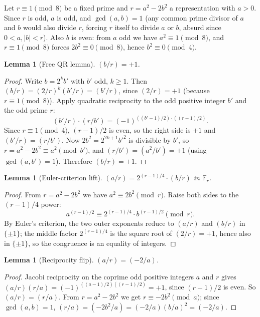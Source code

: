 \documentclass[12pt]{article}
\theoremstyle{plain}
\newtheorem{lemma}[theorem]{Lemma}
\theoremstyle{definition}
\theoremstyle{remark}
\begin{document}
Let \(r \equiv 1 \pmod 8\) be a fixed prime and \(r = a^2 - 2b^2\)
a representation with \(a > 0\). Since \(r\) is odd, \(a\) is odd,
and \(\gcd(a,b) = 1\) (any common prime divisor of \(a\) and \(b\)
would also divide \(r\), forcing \(r\) itself to divide \(a\) or
\(b\), absurd since \(0 < a, |b| < r\)). Also \(b\) is even: from
\(a\) odd we have \(a^2 \equiv 1 \pmod 8\), and \(r \equiv 1 \pmod 8\)
forces \(2b^2 \equiv 0 \pmod 8\), hence \(b^2 \equiv 0 \pmod 4\).

\begin{lemma}[Free QR lemma]\label{lem:A.1}
\((b/r) = +1\).
\end{lemma}


\begin{proof}
Write \(b = 2^k b'\) with \(b'\) odd, \(k \geq 1\). Then
\((b/r) = (2/r)^k (b'/r) = (b'/r)\), since \((2/r) = +1\) (because
\(r \equiv 1 \pmod 8\)). Apply quadratic reciprocity to the odd
positive integer \(b'\) and the odd prime \(r\):
\[
(b'/r) \cdot (r/b') = (-1)^{((b'-1)/2)\cdot((r-1)/2)}.
\]
Since \(r \equiv 1 \pmod 4\), \((r-1)/2\) is even, so the right
side is \(+1\) and \((b'/r) = (r/b')\). Now
\(2b^2 = 2^{2k+1} b'^2\) is divisible by \(b'\), so
\(r = a^2 - 2b^2 \equiv a^2 \pmod{b'}\), and
\((r/b') = (a^2/b') = +1\) (using \(\gcd(a,b') = 1\)). Therefore
\((b/r) = +1\).\end{proof}


\begin{lemma}[Euler-criterion lift]\label{lem:A.2}
\((a/r) = 2^{(r-1)/4} \cdot (b/r)\)
in \(\mathbb F_r\).
\end{lemma}


\begin{proof}
From \(r = a^2 - 2b^2\) we have \(a^2 \equiv 2b^2 \pmod r\).
Raise both sides to the \((r-1)/4\) power:
\[
a^{(r-1)/2} \equiv 2^{(r-1)/4} \cdot b^{(r-1)/2} \pmod r.
\]
By Euler's criterion, the two outer exponents reduce to \((a/r)\)
and \((b/r)\) in \(\{\pm 1\}\); the middle factor
\(2^{(r-1)/4}\) is the square root of \((2/r) = +1\), hence also
in \(\{\pm 1\}\), so the congruence is an equality of integers.\end{proof}


\begin{lemma}[Reciprocity flip]\label{lem:A.3}
\((a/r) = (-2/a)\).
\end{lemma}


\begin{proof}
Jacobi reciprocity on the coprime odd positive integers
\(a\) and \(r\) gives \((a/r)(r/a) = (-1)^{((a-1)/2)((r-1)/2)} = +1\),
since \((r-1)/2\) is even. So \((a/r) = (r/a)\). From
\(r = a^2 - 2b^2\) we get \(r \equiv -2b^2 \pmod a\); since
\(\gcd(a,b) = 1\),
\((r/a) = (-2b^2/a) = (-2/a)(b/a)^2 = (-2/a)\).\end{proof}
\end{document}
